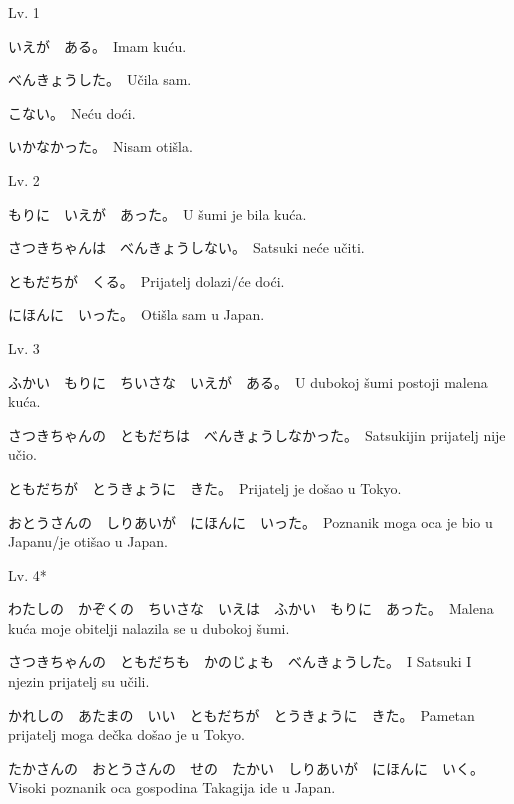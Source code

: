 
\author{Katja Kržišnik}

	
	\begin{mondai}{\noindent Lv. 1}
		\item いえが　ある。　Imam kuću.
		\item べんきょうした。　Učila sam.
		\item こない。　Neću doći.
		\item いかなかった。　Nisam otišla.
	\end{mondai}
	\begin{mondai}{Lv. 2}
		\item もりに　いえが　あった。　U šumi je bila kuća.
		\item さつきちゃんは　べんきょうしない。　Satsuki neće učiti.
		\item ともだちが　くる。　Prijatelj dolazi/će doći.
		\item にほんに　いった。　Otišla sam u Japan.
	\end{mondai}
	\begin{mondai}{Lv. 3}
		\item ふかい　もりに　ちいさな　いえが　ある。　U dubokoj šumi postoji malena kuća.
		\item さつきちゃんの　ともだちは　べんきょうしなかった。　Satsukijin prijatelj nije učio.
		\item ともだちが　とうきょうに　きた。　Prijatelj je došao u Tokyo.
		\item おとうさんの　しりあいが　にほんに　いった。　Poznanik moga oca je bio u Japanu/je otišao u Japan.
	\end{mondai}
	\begin{mondai}{Lv. 4*}
		\item わたしの　かぞくの　ちいさな　いえは　ふかい　もりに　あった。　Malena kuća moje obitelji nalazila se u dubokoj šumi.
		\item さつきちゃんの　ともだちも　かのじょも　べんきょうした。　I Satsuki I njezin prijatelj su učili.
		\item かれしの　あたまの　いい　ともだちが　とうきょうに　きた。　Pametan prijatelj moga dečka došao je u Tokyo.
		\item たかさんの　おとうさんの　せの　たかい　しりあいが　にほんに　いく。　Visoki poznanik oca gospodina Takagija ide u Japan.
	\end{mondai}

